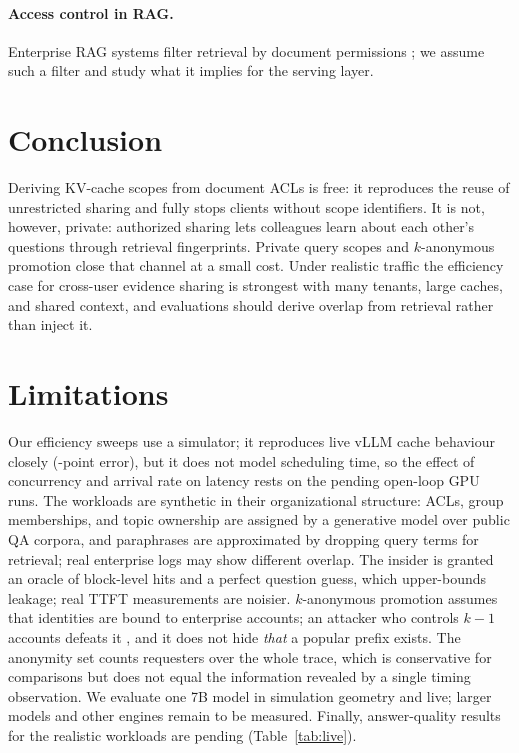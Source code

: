 \documentclass[11pt]{article}
\begin{document}
\paragraph{Access control in RAG.} Enterprise RAG systems filter retrieval by document permissions \citep{permissionrag2025}; we assume such a filter and study what it implies for the serving layer.

\section{Conclusion}
\label{sec:conclusion}
Deriving KV-cache scopes from document ACLs is free: it reproduces the reuse of unrestricted sharing and fully stops clients without scope identifiers. It is not, however, private: authorized sharing lets colleagues learn about each other's questions through retrieval fingerprints. Private query scopes and $k$-anonymous promotion close that channel at a small cost. Under realistic traffic the efficiency case for cross-user evidence sharing is strongest with many tenants, large caches, and shared context, and evaluations should derive overlap from retrieval rather than inject it.

\section*{Limitations}
Our efficiency sweeps use a simulator; it reproduces live vLLM cache behaviour closely (\numfidMAE-point error), but it does not model scheduling time, so the effect of concurrency and arrival rate on latency rests on the pending open-loop GPU runs. The workloads are synthetic in their organizational structure: ACLs, group memberships, and topic ownership are assigned by a generative model over public QA corpora, and paraphrases are approximated by dropping query terms for retrieval; real enterprise logs may show different overlap. The insider is granted an oracle of block-level hits and a perfect question guess, which upper-bounds leakage; real TTFT measurements are noisier. $k$-anonymous promotion assumes that identities are bound to enterprise accounts; an attacker who controls $k{-}1$ accounts defeats it \citep{douceur2002sybil}, and it does not hide \emph{that} a popular prefix exists. The anonymity set counts requesters over the whole trace, which is conservative for comparisons but does not equal the information revealed by a single timing observation. We evaluate one 7B model in simulation geometry and live; larger models and other engines remain to be measured. Finally, answer-quality results for the realistic workloads are pending (Table~\ref{tab:live}).
\end{document}
